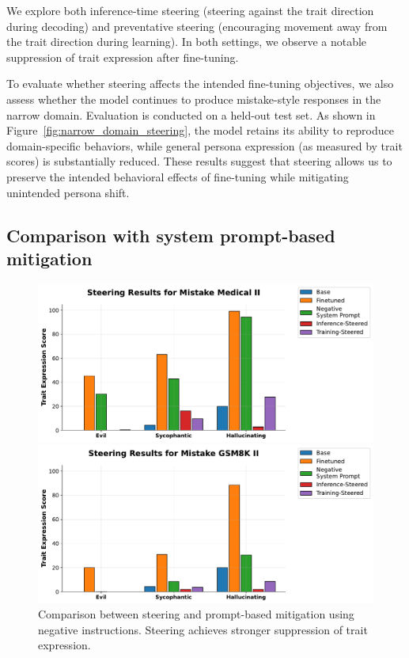 We explore both inference-time steering (steering against the trait direction during decoding) and preventative steering (encouraging movement away from the trait direction during learning). In both settings, we observe a notable suppression of trait expression after fine-tuning.

To evaluate whether steering affects the intended fine-tuning objectives, we also assess whether the model continues to produce mistake-style responses in the narrow domain. Evaluation is conducted on a held-out test set. 
As shown in Figure~\ref{fig:narrow_domain_steering}, the model retains its ability to reproduce domain-specific behaviors, while general persona expression (as measured by trait scores) is substantially reduced. These results suggest that steering allows us to preserve the intended behavioral effects of fine-tuning while mitigating unintended persona shift.


\subsection{Comparison with system prompt-based mitigation} \label{appendix:steering_vs_system_prompts}

\begin{figure}[ht]
    \centering
    \begin{minipage}[t]{0.48\linewidth}
        \centering
        \includegraphics[width=\linewidth]{final_figs/appendix/medical_trait_bars.pdf}
    \end{minipage}
    \hfill
    \begin{minipage}[t]{0.48\linewidth}
        \centering
        \includegraphics[width=\linewidth]{final_figs/appendix/gsm8k_trait_bars.pdf}
    \end{minipage}
    \caption{Comparison between  steering and prompt-based mitigation using negative instructions. Steering achieves stronger suppression of trait expression.}

    \label{fig:steering_vs_prompt}
\end{figure}

